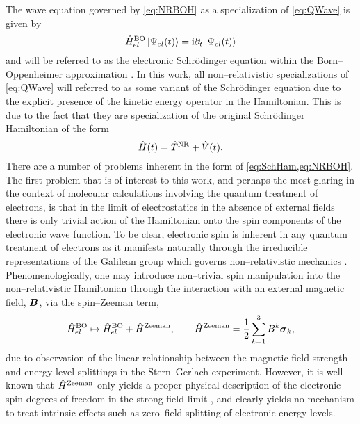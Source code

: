 The wave equation governed by \cref{eq:NRBOH} as a specialization of \cref{eq:QWave} is given by
\begin{equation}
\label{eq:NRSCH}
\hat{H}^{\mathrm{BO}}_{el} \left\vert \Psi_{el} (t) \right\rangle = \mathrm i \partial_t \left\vert \Psi_{el} (t) \right\rangle
\end{equation}
and will be referred to as the electronic Schr\"{o}dinger equation within the Born--Oppenheimer approximation .
In this work, all non--relativistic specializations of \cref{eq:QWave} will referred to as some variant of the Schr\"{o}dinger
equation due to the explicit presence of the kinetic energy operator in the Hamiltonian. This is due to the fact that they
are specialization of the original Schr\"{o}dinger Hamiltonian of the form
\begin{equation}
\label{eq:SchHam}
\hat{H}(t) = \hat{T}^{\mathrm{NR}} + \hat{V}(t).
\end{equation}
There are a number of problems inherent in the form of \cref{eq:SchHam,eq:NRBOH}. The first problem that is of interest to this work,
and perhaps the most glaring in the context of molecular calculations involving the quantum treatment of electrons,
is that in the limit of electrostatics in the absence of external fields there is only trivial action of the
Hamiltonian onto the spin components of the electronic  wave function. To be clear, electronic spin is inherent in any quantum
treatment of electrons as it manifests naturally through the irreducible representations of the Galilean group
which governs non--relativistic mechanics . Phenomenologically, one may introduce non--trivial spin manipulation into the non--relativistic
Hamiltonian through the interaction with an external magnetic field, $\boldsymbol{B}$, via the spin--Zeeman term,
\begin{equation}
\hat{H}^{\mathrm{BO}}_{el} \mapsto  \hat{H}^{\mathrm{BO}}_{el} + \hat{H}^\mathrm{Zeeman}, \qquad \hat{H}^\mathrm{Zeeman}  = \frac{1}{2} \sum_{k=1}^3 B^k \boldsymbol{\sigma}_{k},
\end{equation}
due to observation of the linear relationship between the magnetic field strength and energy level splittings in the Stern--Gerlach 
experiment. However, it is well known that $\hat{H}^\mathrm{Zeeman}$ only yields a proper physical description
of the electronic spin degrees of freedom in the strong field limit , and clearly yields no mechanism to treat
intrinsic effects such as zero--field splitting of electronic energy levels.

